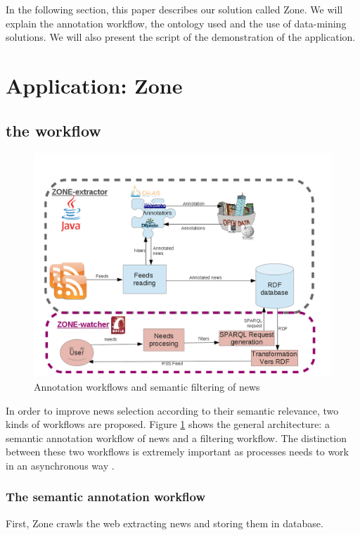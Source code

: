 \documentclass{llncs}
\begin{document}
In the following section, this paper describes our solution called Zone. We will explain the annotation workflow, the ontology used and the use of data-mining solutions. We will also present the script of the demonstration of the application.

%
\section{Application: Zone}


\subsection{the workflow}
%
\begin{figure}[htb!]
	\begin{centering}
	\includegraphics[width=1\textwidth]{diagramArchi.png}
	\caption{Annotation workflows and semantic filtering of news}
	\label{fig:WF}
	\end{centering}
\end{figure}

In order to improve news selection according to their semantic relevance, two kinds of workflows are proposed. Figure \ref{fig:WF} shows the general architecture: a semantic annotation workflow of news and a filtering workflow. The distinction between these two workflows is extremely important as processes needs to work in an asynchronous way \cite{desclaux:urli}.

\subsubsection{The semantic annotation workflow}
First, Zone crawls the web extracting news and storing them in database.
\end{document}
